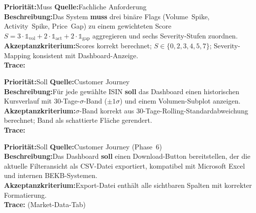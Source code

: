 \documentclass[11pt, a4paper, oneside, openany]{report}
\newcommand{\code}[1]{{\codefont\small\textcolor{DeepNavy}{#1}}}
\begin{document}
\vspace{6pt}

\begin{reqbox}
\textbf{Priorität:}\;Muss \quad \textbf{Quelle:}\;Fachliche Anforderung \\[4pt]
\textbf{Beschreibung:}\;Das System \textbf{muss} drei binäre Flags (Volume~Spike, Activity~Spike, Price~Gap) zu einem gewichteten Score $S = 3 \cdot \mathbb{1}_\text{vol} + 2 \cdot \mathbb{1}_\text{act} + 2 \cdot \mathbb{1}_\text{gap}$ aggregieren und sechs Severity-Stufen zuordnen. \\[4pt]
\textbf{Akzeptanzkriterium:}\;Scores korrekt berechnet; $S \in \{0,2,3,4,5,7\}$; Severity-Mapping konsistent mit Dashboard-Anzeige. \\[4pt]
\textbf{Trace:}\;\code{backend/operations/metrics.py :: compute\_anomaly\_flags()}
\end{reqbox}

\vspace{6pt}

\begin{reqbox}
\textbf{Priorität:}\;Soll \quad \textbf{Quelle:}\;Customer Journey \\[4pt]
\textbf{Beschreibung:}\;Für jede gewählte ISIN \textbf{soll} das Dashboard einen historischen Kursverlauf mit 30-Tage-$\sigma$-Band ($\pm 1\sigma$) und einem Volumen-Subplot anzeigen. \\[4pt]
\textbf{Akzeptanzkriterium:}\;$\sigma$-Band korrekt aus 30-Tage-Rolling-Standardabweichung berechnet; Band als schattierte Fläche gerendert. \\[4pt]
\textbf{Trace:}\;\code{frontend/operations/charts.py :: chart\_security\_history()}
\end{reqbox}

\vspace{6pt}

\begin{reqbox}
\textbf{Priorität:}\;Soll \quad \textbf{Quelle:}\;Customer Journey (Phase~6) \\[4pt]
\textbf{Beschreibung:}\;Das Dashboard \textbf{soll} einen Download-Button bereitstellen, der die aktuelle Filteransicht als CSV-Datei exportiert, kompatibel mit Microsoft Excel und internen BEKB-Systemen. \\[4pt]
\textbf{Akzeptanzkriterium:}\;Export-Datei enthält alle sichtbaren Spalten mit korrekter Formatierung. \\[4pt]
\textbf{Trace:}\;\code{frontend/app.py} (Market-Data-Tab)
\end{reqbox}
\end{document}
